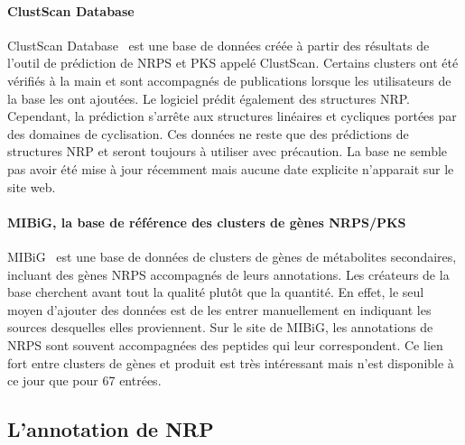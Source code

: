\documentclass[12pt,french,twoside]{report}
\begin{document}
\paragraph{ClustScan Database}
ClustScan Database~\cite{diminic_databases_2013} est une base de données créée à partir des résultats de l'outil de prédiction de NRPS et PKS appelé ClustScan.
Certains clusters ont été vérifiés à la main et sont accompagnés de publications lorsque les utilisateurs de la base les ont ajoutées.
Le logiciel prédit également des structures NRP.
Cependant, la prédiction s'arrête aux structures linéaires et cycliques portées par des domaines de cyclisation.
Ces données ne reste que des prédictions de structures NRP et seront toujours à utiliser avec précaution.
La base ne semble pas avoir été mise à jour récemment mais aucune date explicite n'apparait sur le site web.


\paragraph{MIBiG, la base de référence des clusters de gènes NRPS/PKS}
MIBiG~\cite{medema_minimum_2015} est une base de données de clusters de gènes de métabolites secondaires, incluant des gènes NRPS accompagnés de leurs annotations.
Les créateurs de la base cherchent avant tout la qualité plutôt que la quantité.
En effet, le seul moyen d'ajouter des données est de les entrer manuellement en indiquant les sources desquelles elles proviennent.
Sur le site de MIBiG, les annotations de NRPS sont souvent accompagnées des peptides qui leur correspondent.
Ce lien fort entre clusters de gènes et produit est très intéressant mais n'est disponible à ce jour que pour 67 entrées.



\subsection{L'annotation de NRP}
\end{document}
